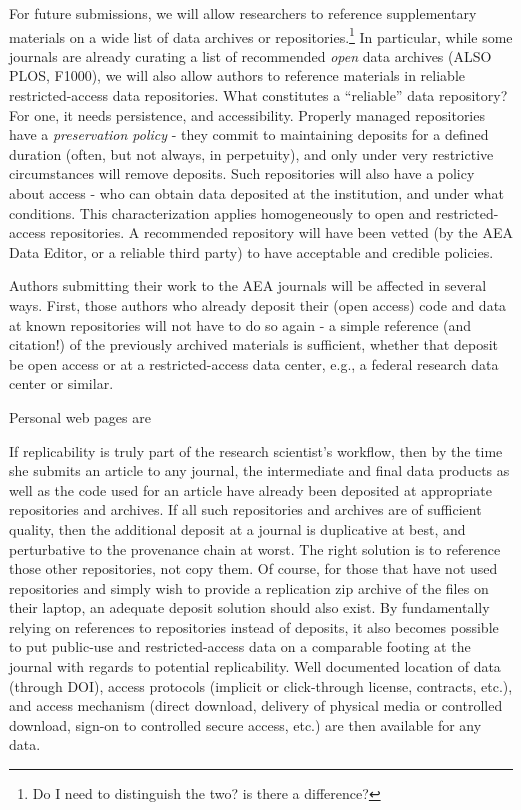 \documentclass[AEJ]{AEA}
\begin{document}
For future submissions, we will allow researchers to reference supplementary materials on a wide list of data archives or repositories.\footnote{Do I need to distinguish the two? is there a difference?} 
In particular, while some journals are already curating a list of recommended \textit{open} data archives \citep{Nature_Scientific_Data2016-hl} (ALSO PLOS, F1000), we will also allow authors to reference materials in reliable restricted-access data repositories. What constitutes a ``reliable'' data repository? For one, it needs persistence, and accessibility. Properly managed repositories have a \textit{preservation policy} - they commit to maintaining deposits for a defined duration (often, but not always, in perpetuity), and only under very restrictive circumstances will remove deposits. Such repositories will also have a policy about access - who can obtain data deposited at the institution, and under what conditions. This characterization applies homogeneously to open and restricted-access repositories. A recommended repository will have been vetted (by the AEA Data Editor, or a reliable third party) to have acceptable and credible policies. 

Authors submitting their work to the AEA journals will be affected in several ways. First, those authors who already deposit their (open access) code and data at known repositories will not have to do so again - a simple reference (and citation!) of the previously archived materials is sufficient, whether that deposit be open access or at a restricted-access data center, e.g., a federal research data center or similar. 

Personal web pages are    


If replicability is truly part of the research scientist's workflow, then by the time she submits an article to any journal, the intermediate and final data products as well as the code used for an article have already been deposited at appropriate repositories and archives. If all such repositories and archives are of sufficient quality, then the additional deposit at a journal is duplicative at best, and perturbative to the provenance chain at worst. The right solution is to reference those other repositories, not copy them. Of course, for those that have not used repositories and simply wish to provide a replication zip archive of the files on their laptop, an adequate deposit solution should also exist.
By fundamentally relying on references to repositories instead of deposits, it also becomes possible to put public-use and restricted-access data on a comparable footing at the journal with regards to potential replicability. Well documented location of data (through DOI), access protocols (implicit or click-through license, contracts, etc.), and access mechanism (direct download, delivery of physical media or controlled download, sign-on to controlled secure access, etc.) are then available for any data.
\end{document}
